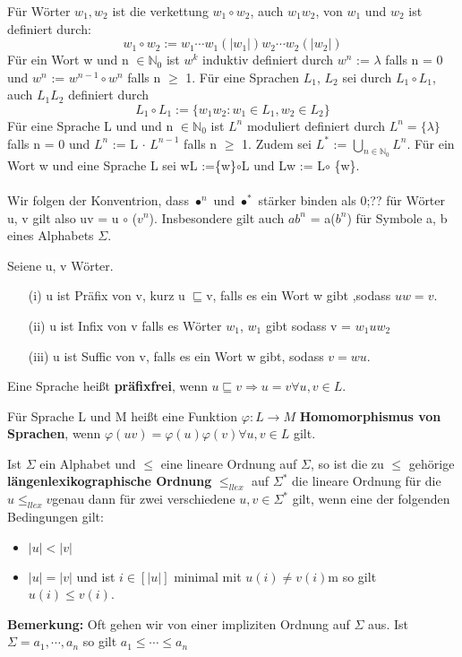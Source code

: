 Für Wörter $w_{1}, w_{2}$ ist die verkettung  $w_{1} \circ w_{2}$, auch $w_{1}w_{2}$, von $w_{1}$ und $w_{2}$ ist definiert durch:
\[w_{1} \circ w_{2} := w_{1} \cdots w_{1} (\lvert w_{1} \rvert)w_{2} \cdots w_{2} (\lvert w_{2} \rvert)\]
Für ein Wort w und n $\in \mathbb{N}_{0}$ ist $w^{k}$ induktiv definiert durch $w^{n}$ := $\lambda$ falls n = 0 und $w^{n}$ := $w^{n-1} \circ w^{n}$ falls n $\geq $ 1. Für eine Sprachen $L_{1}$, $L_{2}$ sei durch $L_{1} \circ L_{1}$, auch $L_{1}L_{2}$ definiert durch
\[L_{1} \circ L_{1} := \{w_{1}w_{2} : w_{1} \in L_{1}, w_{2} \in L_{2}\}\]
Für eine Sprache L und und n $\in\mathbb{N}_{0}$ ist $L^{n}$ moduliert definiert durch $L^{n} = \{\lambda\}$ falls n = 0 und $L^{n}$ := L $\cdot$ $L^{n - 1}$ falls n $\geq$ 1. Zudem sei $L^{*}$ := $\bigcup \limits_{n \in \mathbb{N}_{0}}L^{n}$. Für ein Wort w und eine Sprache L sei wL :=\{w\}$\circ$L und Lw := L$\circ$ \{w\}.\\\\Wir folgen der Konventrion, dass $\bullet^{n}$ und $\bullet^{*}$ stärker binden als 0;?? für Wörter u, v gilt also uv = u $\circ$ ($v^{n}$). Insbesondere gilt auch $ab^{n}$ = a($b^{n}$) für Symbole a, b eines Alphabets $\Sigma$.

Seiene u, v Wörter.
\begin{itemize}
    \item [(i)] u ist Präfix von v, kurz u $\sqsubseteq $v, falls es ein Wort w gibt ,sodass $uw = v$.
    \item [(ii)] u ist Infix von v falls es Wörter $w_{1}$, $w_{1}$ gibt sodass v = $w_{1} u w_{2}$
    \item [(iii)] u ist Suffic von v, falls es ein Wort w gibt, sodass $v = wu$.
\end{itemize}

Eine Sprache heißt \textbf{präfixfrei}, wenn $u\sqsubseteq v \Rightarrow u = v \forall u,v \in L$.

Für Sprache L und M heißt eine Funktion $\varphi : L \rightarrow M$ \textbf{Homomorphismus von Sprachen}, wenn $\varphi(uv) = \varphi (u) \varphi (v) \forall u, v \in L$ gilt.

 Ist $\Sigma$ ein Alphabet und $\leq $ eine lineare Ordnung auf $\Sigma$, so ist die zu $\leq $ gehörige \textbf{längenlexikographische Ordnung} $\leq_{llex}$ auf $\Sigma^{*}$ die lineare Ordnung für die $u \leq_{llex} v $genau dann für zwei verschiedene $u, v\in \Sigma^{*}$ gilt, wenn eine der folgenden Bedingungen gilt:
\begin{itemize}
    \item $\lvert u \rvert < \lvert v \rvert$
    \item $\lvert u \rvert = \lvert v \rvert$ und ist $i \in [|u|]$ minimal mit 
    $u(i) \neq v(i)$m so gilt $u(i) \leq v(i)$.
\end{itemize}
\textbf{Bemerkung: }Oft gehen wir von einer impliziten Ordnung auf $\Sigma$ aus. Ist $\Sigma = {a_{1}, \cdots, a_{n}}$ so gilt $a_{1}\leq \cdots \leq a_{n}$

